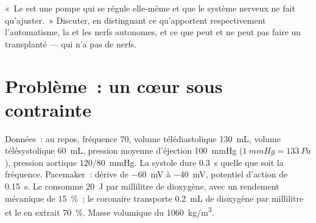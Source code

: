 \begin{exercise}[$\star\star\star$]\label{exo:b2:heart:12}
«~Le  est une pompe qui se régule elle-même et que le système
nerveux ne fait qu'ajuster.~» Discuter, en distinguant ce qu'apportent
respectivement l'automatisme, la  et les nerfs
autonomes, et ce que peut et ne peut pas faire un  transplanté ---
qui n'a pas de nerfs.
\end{exercise}

\section{Problème~: un cœur sous contrainte}

\begin{problem}
\label{pb:b2:heart:1}
Données~: au repos, fréquence 70, volume télédiastolique \qty{130}{mL},
volume télésystolique \qty{60}{mL}, pression moyenne d'éjection
\qty{100}{mmHg} ($\qty{1}{mmHg} = \qty{133}{Pa}$), pression aortique
$120/80$~mmHg. La systole dure \qty{0.3}{s} quelle que soit la
fréquence. Pacemaker~: dérive de \qty{-60}{mV} à \qty{-40}{mV}, potentiel
d'action de \qty{0.15}{s}. Le  consomme \qty{20}{J} par millilitre
de dioxygène, avec un rendement mécanique de \qty{15}{\%}~; le 
coronaire transporte \qty{0.2}{mL} de dioxygène par millilitre et le
 en extrait \qty{70}{\%}. Masse volumique du 
\qty{1060}{kg/m^3}.


\end{problem}
